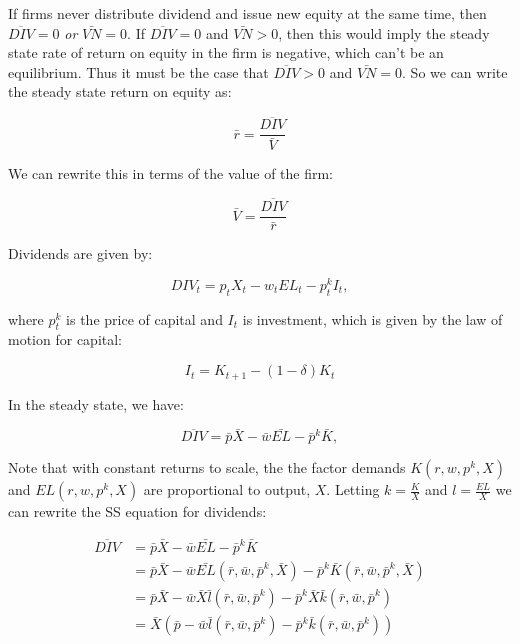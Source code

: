 \documentclass[letterpaper,12pt]{article}
\theoremstyle{definition}
\begin{document}
If firms never distribute dividend and issue new equity at the same time, then $\overline{DIV}=0$ \emph{or} $\bar{VN}=0$.  If $\overline{DIV}=0$ and $\bar{VN}>0$, then this would imply the steady state rate of return on equity in the firm is negative, which can't be an equilibrium.  Thus it must be the case that $\overline{DIV}>0$ and $\bar{VN}=0$.  So we can write the steady state return on equity as:

\begin{equation}
\label{eqn:equity_return}
\bar{r} = \frac{\overline{DIV}}{\bar{V}}
\end{equation} 

We can rewrite this in terms of the value of the firm:

\begin{equation}
\label{eqn:firm_val_ss}
\bar{V} = \frac{\overline{DIV}}{\bar{r}}
\end{equation} 


Dividends are given by:

\begin{equation}
DIV_{t} = p_{t}X_{t} - w_{t}EL_{t} - p^{k}_{t}I_{t},
\end{equation}

\noindent\noindent where $p^{k}_{t}$ is the price of capital and $I_{t}$ is investment, which is given by the law of motion for capital:

\begin{equation}
I_{t} = K_{t+1}-(1-\delta)K_{t}
\end{equation}

In the steady state, we have:

\begin{equation}
\label{eqn:ssDIV}
\overline{DIV} = \bar{p}\bar{X} - \bar{w}\bar{EL} - \bar{p}^{k}\bar{K},
\end{equation}

\noindent\noindent Note that with constant returns to scale, the the factor demands $K(r,w,p^{k},X)$ and $EL(r,w,p^{k},X)$ are proportional to output, $X$.  Letting $k=\frac{K}{X}$ and $l=\frac{EL}{X}$ we can rewrite the SS equation for dividends:

\begin{equation}
\begin{split}
\label{eqn:ssDIV_decomposed}
\overline{DIV} & = \bar{p}\bar{X} - \bar{w}\bar{EL} - \bar{p}^{k}\bar{K} \\
&  = \bar{p}\bar{X} - \bar{w}\bar{EL}(\bar{r},\bar{w},\bar{p}^{k},\bar{X}) - \bar{p}^{k}\bar{K}(\bar{r},\bar{w},\bar{p}^{k},\bar{X}) \\
& = \bar{p}\bar{X} - \bar{w}\bar{X}\bar{l}(\bar{r},\bar{w},\bar{p}^{k}) - \bar{p}^{k}\bar{X}\bar{k}(\bar{r},\bar{w},\bar{p}^{k}) \\
& = \bar{X}\left(\bar{p} - \bar{w}\bar{l}(\bar{r},\bar{w},\bar{p}^{k}) - \bar{p}^{k}\bar{k}(\bar{r},\bar{w},\bar{p}^{k})\right) \\
\end{split}
\end{equation}
\end{document}

